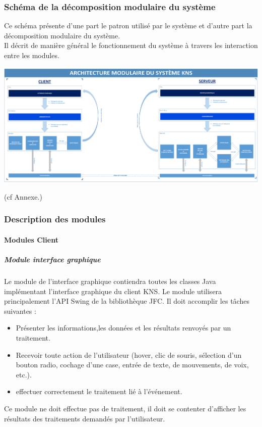 \documentclass[10pt,a4paper]{report}
\begin{document}
		\subsubsection{Schéma de la décomposition modulaire du système}
			\begin{flushleft}
			Ce schéma présente d'une part le patron utilisé par le système et d'autre part la décomposition modulaire du système.\\
			Il décrit de manière général le fonctionnement du système à travers les interaction entre les modules.
			\end{flushleft}
			\begin{center}
				\includegraphics[scale=0.23]{Ressources/modules_KNS.png}
			\end{center}
		(cf Annexe.)

		\subsubsection{Description des modules}
		
			\paragraph{Modules Client}

				\subparagraph{Module interface graphique}
				\begin{flushleft}
				Le module de l'interface graphique contiendra toutes les classes Java implémentant l'interface graphique du client KNS. Le module utilisera principalement l'API Swing de la bibliothèque JFC. Il doit  accomplir les tâches suivantes :\\
					
					\begin{itemize}
						\item Présenter les informations,les données et les résultats renvoyés par un traitement.
						\item Recevoir toute action de l'utilisateur (hover, clic de souris, sélection d'un bouton radio, cochage d'une case, entrée de texte, de mouvements, de voix, etc.).
						\item effectuer correctement le traitement lié à l'événement. 
					\end{itemize}
					
					Ce module ne doit effectue pas de traitement, il doit se contenter d'afficher les résultats des traitements demandés par l'utilisateur.\\
				\end{flushleft}
						
\end{document}
